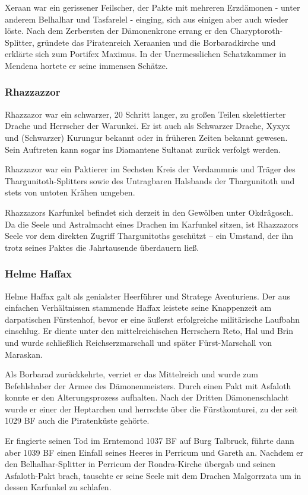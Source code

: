 Xeraan war ein gerissener Feilscher, der Pakte mit mehreren Erzdämonen - unter anderem Belhalhar und Tasfarelel - einging, sich aus einigen aber auch wieder löste. Nach dem Zerbersten der Dämonenkrone errang er den Charyptoroth-Splitter, gründete das Piratenreich Xeraanien und die Borbaradkirche und erklärte sich zum Portifex Maximus. In der Unermesslichen Schatzkammer in Mendena hortete er seine immensen Schätze. 

\subsubsection{Rhazzazzor}
Rhazzazor war ein schwarzer, 20 Schritt langer, zu großen Teilen skelettierter Drache und Herrscher der Warunkei. Er ist auch als Schwarzer Drache, Xyxyx und (Schwarzer) Kurungur bekannt oder in früheren Zeiten bekannt gewesen. Sein Auftreten kann sogar ins Diamantene Sultanat zurück verfolgt werden.

Rhazzazor war ein Paktierer im Sechsten Kreis der Verdammnis und Träger des Thargunitoth-Splitters sowie des Untragbaren Halsbands der Thargunitoth und stets von untoten Krähen umgeben.

Rhazzazors Karfunkel befindet sich derzeit in den Gewölben unter Okdrâgosch. Da die Seele und Astralmacht eines Drachen im Karfunkel sitzen, ist Rhazzazors Seele vor dem direkten Zugriff Thargunitoths geschützt – ein Umstand, der ihn trotz seines Paktes die Jahrtausende überdauern ließ. 

\subsubsection{Helme Haffax}
Helme Haffax galt als genialster Heerführer und Stratege Aventuriens. Der aus einfachen Verhältnissen stammende Haffax leistete seine Knappenzeit am darpatischen Fürstenhof, bevor er eine äußerst erfolgreiche militärische Laufbahn einschlug. Er diente unter den mittelreichischen Herrschern Reto, Hal und Brin und wurde schließlich Reichserzmarschall und später Fürst-Marschall von Maraskan.

Als Borbarad zurückkehrte, verriet er das Mittelreich und wurde zum Befehlshaber der Armee des Dämonenmeisters. Durch einen Pakt mit Asfaloth konnte er den Alterungsprozess aufhalten. Nach der Dritten Dämonenschlacht wurde er einer der Heptarchen und herrschte über die Fürstkomturei, zu der seit 1029 BF auch die Piratenküste gehörte.

Er fingierte seinen Tod im Erntemond 1037 BF auf Burg Talbruck, führte dann aber 1039 BF einen Einfall seines Heeres in Perricum und Gareth an. Nachdem er den Belhalhar-Splitter in Perricum der Rondra-Kirche übergab und seinen Asfaloth-Pakt brach, tauschte er seine Seele mit dem Drachen Malgorrzata um in dessen Karfunkel zu schlafen.

